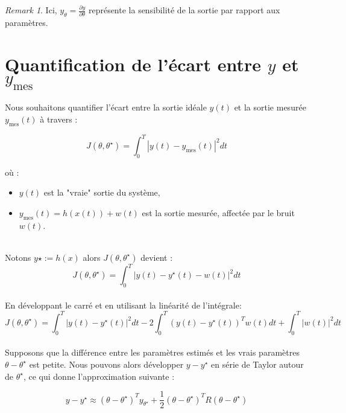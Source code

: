 \documentclass[a4paper]{article}
\theoremstyle{definition}
\theoremstyle{remark}
\newtheorem{remark}{Remark}
\begin{document}
\begin{remark}
    Ici, $ y_{\theta} = \frac{\partial y}{\partial \theta} $ représente la sensibilité de la sortie par rapport aux paramètres.
\end{remark}

\section{Quantification de l'écart entre \( y \) et \( y_{\text{mes}} \)}

Nous souhaitons quantifier l'écart entre la sortie idéale \( y(t) \) et la sortie mesurée \( y_{\text{mes}}(t) \) à travers :

\begin{equation}
J(\theta, \theta^\star) = \int_0^T \left| y(t) - y_{\text{mes}}(t) \right|^2 dt
\end{equation}

où :
\begin{itemize}
    \item \( y(t) \) est la "vraie" sortie du système,
    \item \( y_{\text{mes}}(t) = h(x(t)) + w(t) \) est la sortie mesurée, affectée par le bruit \( w(t) \).
\end{itemize}
\\
Notons $y\star := h(x)$ alors \( J(\theta, \theta^\star) \) devient : 
\begin{equation}
J(\theta, \theta^\star) = \int_0^T \left| y(t) - y^\star(t) - w(t) \right|^2 dt
\label{Jdep}
\end{equation}
\\
En développant le carré et en utilisant la linéarité de l'intégrale:
\begin{equation}
J(\theta, \theta^\star) = \int_0^T |y(t) - y^\star(t)|^2 dt  
- 2 \int_0^T  (y(t) - y^\star(t))^T w(t) dt  
+ \int_0^T |w(t)|^2 dt
\label{Jdev}
\end{equation}
\\
Supposons que la différence entre les paramètres estimés et les vrais paramètres \( \theta - \theta^\star \) est petite. Nous pouvons alors développer \( y - y^\star \) en série de Taylor autour de \( \theta^\star \), ce qui donne l'approximation suivante :

\begin{equation}
y - y^\star \approx (\theta - \theta^\star)^T y_{\theta^\star} + \frac{1}{2} (\theta - \theta^\star)^T R (\theta - \theta^\star)
\end{equation}
\end{document}
